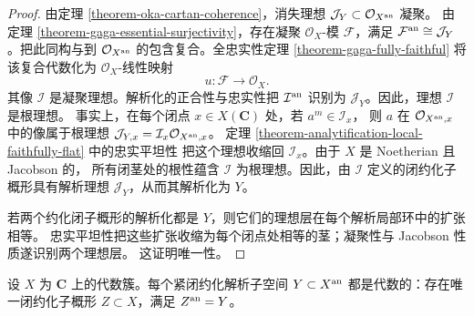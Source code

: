 \begin{proof}
由定理 \ref{theorem-oka-cartan-coherence}，消失理想
$\mathcal J_Y\subset\mathcal O_{X^{\rm an}}$ 凝聚。
由定理 \ref{theorem-gaga-essential-surjectivity}，存在凝聚
$\mathcal O_X$-模 $\mathcal F$，满足
$\mathcal F^{\rm an}\cong\mathcal J_Y$。把此同构与到
$\mathcal O_{X^{\rm an}}$ 的包含复合。全忠实性定理
\ref{theorem-gaga-fully-faithful} 将该复合代数化为 $\mathcal O_X$-线性映射
$$
u:\mathcal F\longrightarrow\mathcal O_X.
$$
其像 $\mathcal I$ 是凝聚理想。解析化的正合性与忠实性把
$\mathcal I^{\rm an}$ 识别为 $\mathcal J_Y$。因此，理想 $\mathcal I$ 是根理想。
事实上，在每个闭点 $x\in X(\mathbf C)$ 处，若 $a^m\in\mathcal I_x$，
则 $a$ 在 $\mathcal O_{X^{\rm an},x}$ 中的像属于根理想
$\mathcal J_{Y,x}=\mathcal I_x\mathcal O_{X^{\rm an},x}$。
定理 \ref{theorem-analytification-local-faithfully-flat} 中的忠实平坦性
把这个理想收缩回 $\mathcal I_x$。由于 $X$ 是 Noetherian 且 Jacobson 的，
所有闭茎处的根性蕴含 $\mathcal I$ 为根理想。因此，由 $\mathcal I$
定义的闭约化子概形具有解析理想 $\mathcal J_Y$，从而其解析化为 $Y$。

若两个约化闭子概形的解析化都是 $Y$，则它们的理想层在每个解析局部环中的扩张相等。
忠实平坦性把这些扩张收缩为每个闭点处相等的茎；凝聚性与 Jacobson 性质遂识别两个理想层。
这证明唯一性。
\end{proof}

\begin{proposition}
\label{proposition-compact-analytic-subspace-algebraic}
\begin{reference}
\cite[\S 4，第 19 号，命题 14]{GAGA}
\end{reference}
设 $X$ 为 $\mathbf C$ 上的代数簇。每个紧闭约化解析子空间
$Y\subset X^{\rm an}$ 都是代数的：存在唯一闭约化子概形
$Z\subset X$，满足 $Z^{\rm an}=Y$。
\end{proposition}

